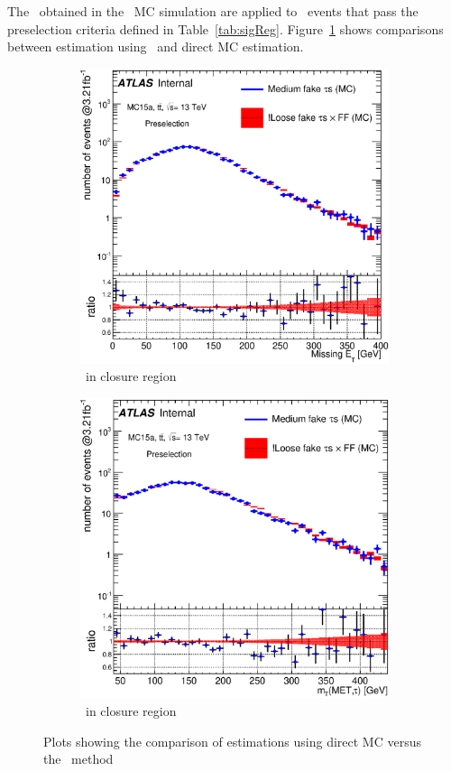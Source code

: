 The \FF\ obtained in the \ttbar\ MC simulation are applied to \ttbar\ events that pass the 
preselection criteria defined in Table~\ref{tab:sigReg}. Figure~\ref{fig:ttClo} shows comparisons 
between estimation using \FF\ and direct MC estimation. 

\begin{figure}[h]
\begin{subfigure}{0.5\textwidth}
   \includegraphics[width=\textwidth]{figures/Fake_MMClosure_met.eps}
\caption{\met\ in \ttbar closure region}
\end{subfigure} %
\begin{subfigure}{0.5\textwidth}
   \includegraphics[width=\textwidth]{figures/Fake_MMClosure_MT.eps}
\caption{\mT\ in \ttbar closure region}
\end{subfigure}
\caption{Plots showing the comparison of estimations using direct MC versus the \FF\ method}
\label{fig:ttClo}
\end{figure}

